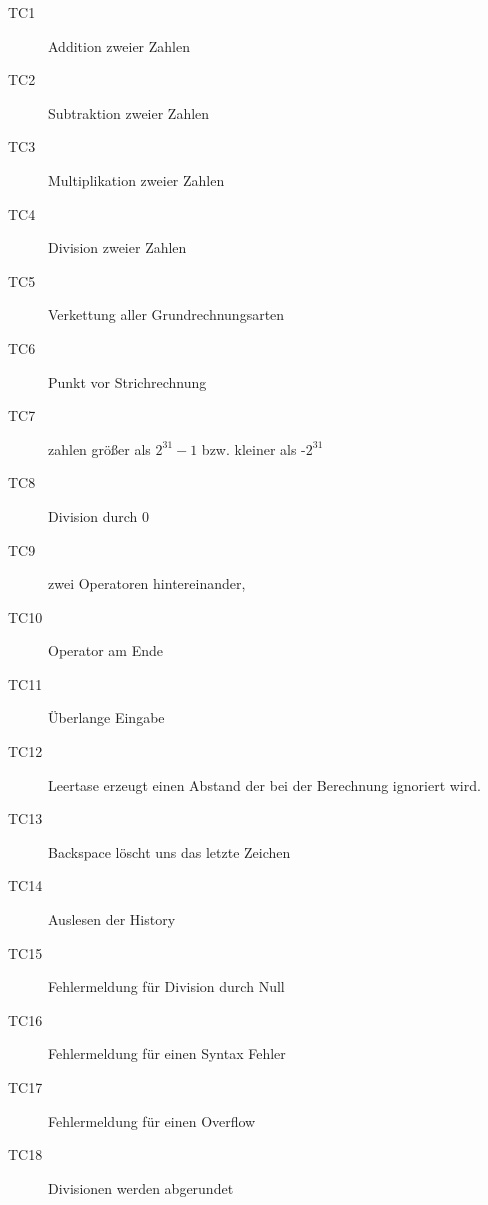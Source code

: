 \begin{description}
 \item[TC1] Addition zweier Zahlen
 \item[TC2] Subtraktion zweier Zahlen
 \item[TC3] Multiplikation zweier Zahlen
 \item[TC4] Division zweier Zahlen
 \item[TC5] Verkettung aller Grundrechnungsarten
 \item[TC6] Punkt vor Strichrechnung
 \item[TC7] zahlen größer als $2^{31}-1$ bzw. kleiner als -$2^{31}$
 \item[TC8] Division durch 0
 \item[TC9] zwei Operatoren hintereinander, 
 \item[TC10] Operator am Ende
 \item[TC11] Überlange Eingabe
 \item[TC12] Leertase erzeugt einen Abstand der bei der Berechnung ignoriert wird.
 \item[TC13] Backspace löscht uns das letzte Zeichen
 \item[TC14] Auslesen der History
 \item[TC15] Fehlermeldung für Division durch Null
 \item[TC16] Fehlermeldung für einen Syntax Fehler
 \item[TC17] Fehlermeldung für einen Overflow
 \item[TC18] Divisionen werden abgerundet
\end{description}

